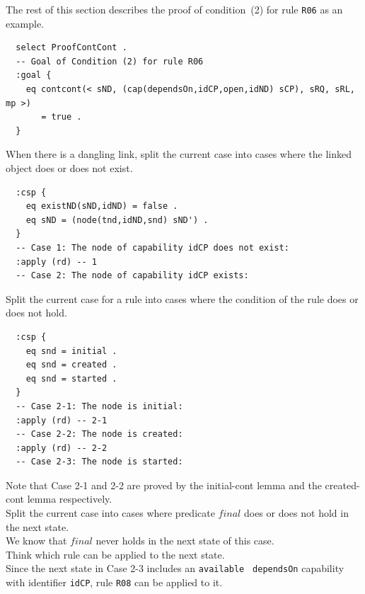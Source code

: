 \documentclass[12pt]{report}
\begin{document}
The rest of this section describes the proof of condition~(2)
for rule {\tt R06} as an example.
\small
\begin{verbatim}
  select ProofContCont .
  -- Goal of Condition (2) for rule R06
  :goal {
    eq contcont(< sND, (cap(dependsOn,idCP,open,idND) sCP), sRQ, sRL, mp >)
       = true .
  }
\end{verbatim}
\normalsize

 When there is a dangling link, split the
current case into cases where the linked object does or does not
exist.
\small
\begin{verbatim}
  :csp {
    eq existND(sND,idND) = false .
    eq sND = (node(tnd,idND,snd) sND') .
  }
  -- Case 1: The node of capability idCP does not exist:
  :apply (rd) -- 1
  -- Case 2: The node of capability idCP exists:
\end{verbatim}
\normalsize

 Split the current case for a rule into
cases where the condition of the rule does or does not hold.
\small
\begin{verbatim}
  :csp {
    eq snd = initial .
    eq snd = created .
    eq snd = started .
  }
  -- Case 2-1: The node is initial:
  :apply (rd) -- 2-1
  -- Case 2-2: The node is created:
  :apply (rd) -- 2-2
  -- Case 2-3: The node is started:
\end{verbatim}
\normalsize
Note that Case 2-1 and 2-2 are proved by the initial-cont lemma and
the created-cont lemma respectively.\\

 Split the current case into cases where
predicate $final$ does or does not hold in the next state.\\
We know that $final$ never holds in the next state of this case.\\

 Think which rule can be applied to the next
state. \\
Since the next state in Case 2-3 includes an {\tt available} {\tt
  dependsOn} capability with identifier {\tt idCP}, rule {\tt R08} can
be applied to it.\\
\end{document}
